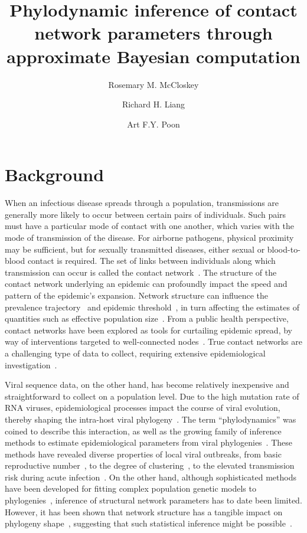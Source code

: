\documentclass[12pt]{article}\usepackage[]{graphicx}\usepackage[]{color}
\title{Phylodynamic inference of contact network parameters through approximate
Bayesian computation}
\author{Rosemary M. McCloskey \and Richard H. Liang \and Art F.Y. Poon}
\begin{document}
\maketitle

\section*{Background}

When an infectious disease spreads through a population, transmissions are
generally more likely to occur between certain pairs of individuals. Such pairs
must have a particular mode of contact with one another, which varies with the
mode of transmission of the disease. For airborne pathogens, physical proximity
may be sufficient, but for sexually transmitted diseases, either sexual or
blood-to-blood contact is required. The set of links between individuals along
which transmission can occur is called the contact
network~\autocite{klovdahl1985social, morris1993epidemiology}. The structure of
the contact network underlying an epidemic can profoundly impact the speed and
pattern of the epidemic's expansion. Network structure can influence the
prevalence trajectory~\autocite{o2010contact} and epidemic
threshold~\autocite{barthelemy2005dynamical}, in turn affecting the estimates
of quantities such as effective population
size~\autocite{goodreau2006assessing}. From a public health perspective,
contact networks have been explored as tools for curtailing epidemic spread, by
way of interventions targeted to well-connected
nodes~\autocite{wang2015targeting}. True contact networks are a challenging
type of data to collect, requiring extensive epidemiological
investigation~\autocite{welch2011statistical}.

Viral sequence data, on the other hand, has become relatively inexpensive and
straightforward to collect on a population level. Due to the high mutation rate
of RNA viruses, epidemiological processes impact the course of viral evolution,
thereby shaping the intra-host viral
phylogeny~\autocite{drummond2003measurably}. The term ``phylodynamics'' was
coined to describe this interaction, as well as the growing family of inference
methods to estimate epidemiological parameters from viral
phylogenies~\autocite{grenfell2004unifying}. These methods have revealed
diverse properties of local viral outbreaks, from basic reproductive
number~\autocite{stadler2011estimating}, to the degree of
clustering~\autocite{hughes2009molecular}, to the elevated transmission risk
during acute infection~\autocite{volz2012simple}. On the other hand, although
sophisticated methods have been developed for fitting complex population
genetic models to phylogenies~\autocite{rasmussen2014phylodynamic}, inference
of structural network parameters has to date been limited. However, it has been
shown that network structure has a tangible impact on phylogeny
shape~\autocite{leventhal2012inferring, colijn2014phylogenetic,
goodreau2006assessing, robinson2013dynamics}, suggesting that such statistical
inference might be possible~\autocite{welch2011statistical}.
\end{document}
